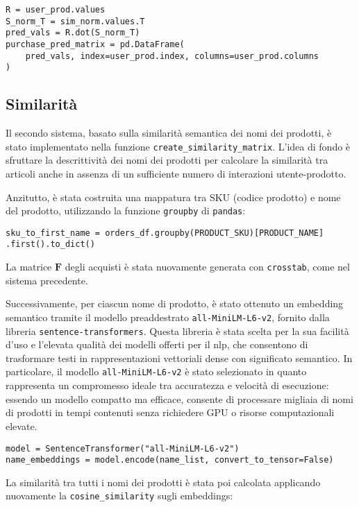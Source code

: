 \begin{verbatim}
R = user_prod.values
S_norm_T = sim_norm.values.T
pred_vals = R.dot(S_norm_T)
purchase_pred_matrix = pd.DataFrame(
    pred_vals, index=user_prod.index, columns=user_prod.columns
)
\end{verbatim}

\subsection{Similarità}

Il secondo sistema, basato sulla similarità semantica dei nomi dei prodotti, è stato implementato nella funzione \texttt{create\_similarity\_matrix}. L'idea di fondo è sfruttare la descrittività dei nomi dei prodotti per calcolare la similarità tra articoli anche in assenza di un sufficiente numero di interazioni utente-prodotto.

Anzitutto, è stata costruita una mappatura tra SKU (codice prodotto) e nome del prodotto, utilizzando la funzione \texttt{groupby} di \texttt{pandas}:

\begin{verbatim}
sku_to_first_name = orders_df.groupby(PRODUCT_SKU)[PRODUCT_NAME]
.first().to_dict()
\end{verbatim}

La matrice $\mathbf{F}$ degli acquisti è stata nuovamente generata con \texttt{crosstab}, come nel sistema precedente.

Successivamente, per ciascun nome di prodotto, è stato ottenuto un embedding semantico tramite il modello preaddestrato \texttt{all-MiniLM-L6-v2}, fornito dalla libreria \texttt{sentence-transformers}. Questa libreria è stata scelta per la sua facilità d’uso e l’elevata qualità dei modelli offerti per il \gls{nlp}, che consentono di trasformare testi in rappresentazioni vettoriali dense con significato semantico. In particolare, il modello \texttt{all-MiniLM-L6-v2} è stato selezionato in quanto rappresenta un compromesso ideale tra accuratezza e velocità di esecuzione: essendo un modello compatto ma efficace, consente di processare migliaia di nomi di prodotti in tempi contenuti senza richiedere GPU o risorse computazionali elevate.

\begin{verbatim}
model = SentenceTransformer("all-MiniLM-L6-v2")
name_embeddings = model.encode(name_list, convert_to_tensor=False)
\end{verbatim}

La similarità tra tutti i nomi dei prodotti è stata poi calcolata applicando nuovamente la \texttt{cosine\_similarity} sugli embeddings:

